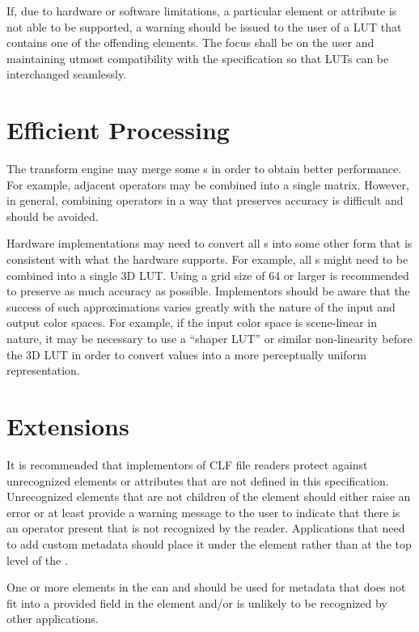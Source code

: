 If, due to hardware or software limitations, a particular element or attribute is not able to be supported, a warning should be issued to the user of a LUT that contains one of the offending elements. The focus shall be on the user and maintaining utmost compatibility with the specification so that LUTs can be interchanged seamlessly.

\section{Efficient Processing}
\label{sec:efficient-processing}
The transform engine may merge some s in order to obtain better performance. For example, adjacent  operators may be combined into a single matrix. However, in general, combining operators in a way that preserves accuracy is difficult and should be avoided. 

Hardware implementations may need to convert all s into some other form that is consistent with what the hardware supports. For example, all s might need to be combined into a single 3D LUT. Using a grid size of 64 or larger is recommended to preserve as much accuracy as possible. Implementors should be aware that the success of such approximations varies greatly with the nature of the input and output color spaces. For example, if the input color space is scene-linear in nature, it may be necessary to use a ``shaper LUT'' or similar non-linearity before the 3D LUT in order to convert values into a more perceptually uniform representation.

 
\section{Extensions}
It is recommended that implementors of CLF file readers protect against unrecognized elements or attributes that are not defined in this specification. Unrecognized elements that are not children of the  element should either raise an error or at least provide a warning message to the user to indicate that there is an operator present that is not recognized by the reader. Applications that need to add custom metadata should place it under the  element rather than at the top level of the .

One or more  elements in the  can and should be used for metadata that does not fit into a provided field in the  element and/or is unlikely to be recognized by other applications.